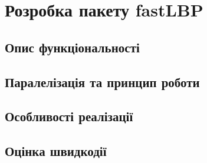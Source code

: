 \section{Розробка пакету fastLBP}\label{section2.2}

\subsection{Опис функціональності}\label{section2.2a}

\subsection{Паралелізація та принцип роботи}\label{section2.2b}

\subsection{Особливості реалізації}\label{section2.2c}

\subsection{Оцінка швидкодії}\label{section2.2d}


